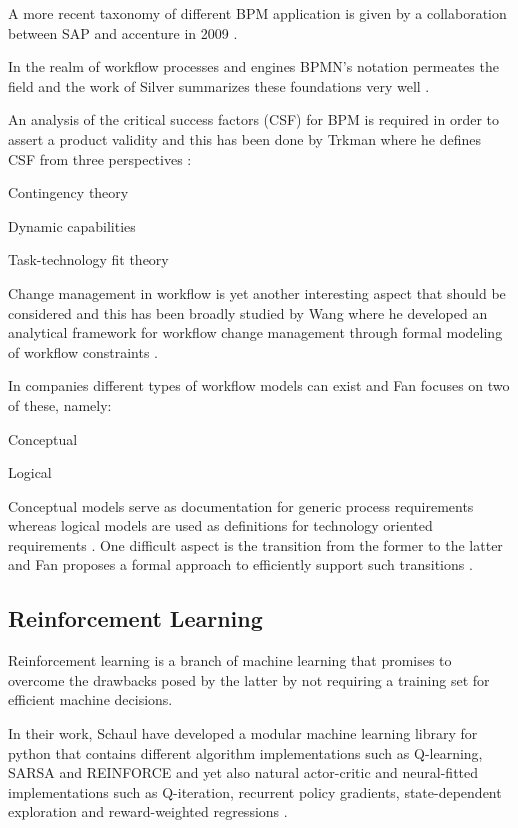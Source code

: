 \documentclass{seal_thesis}
\begin{document}
A more recent taxonomy of different BPM application is given by a collaboration between SAP and accenture in 2009 \cite{EvolvedTechnologist2009}.

In the realm of workflow processes and engines BPMN's notation permeates the field and the work of Silver summarizes these foundations very well \cite{Silver2009}.

An analysis of the critical success factors (CSF) for BPM is required in order to assert a product validity and this has been done by Trkman where he defines CSF from three perspectives \cite{Trkman2010}:
\begin{enumerate*}
	\item Contingency theory
	\item Dynamic capabilities
	\item Task-technology fit theory
\end{enumerate*}


Change management in workflow is yet another interesting aspect that should be considered and this has been broadly studied by Wang where he developed an analytical framework for workflow change management through formal modeling of workflow constraints \cite{Wang2011}.

In companies different types of workflow models can exist and Fan focuses on two of these, namely:
\begin{enumerate*}
	\item Conceptual
	\item Logical
\end{enumerate*}

Conceptual models serve as documentation for generic process requirements whereas logical models are used as definitions for technology oriented requirements \cite{Fan2012}. One difficult aspect is the transition from the former to the latter and Fan proposes a formal approach to efficiently support such transitions \cite{Fan2012}.

\subsection{Reinforcement Learning}


Reinforcement learning is a branch of machine learning that promises to overcome the drawbacks posed by the latter by not requiring a training set for efficient machine decisions. 

In their work, Schaul \etal have developed a modular machine learning library for python that contains different algorithm implementations such as Q-learning, SARSA and REINFORCE and yet also natural actor-critic and neural-fitted implementations such as Q-iteration, recurrent policy gradients, state-dependent exploration and reward-weighted regressions \cite{Schaul2010}.
\end{document}
